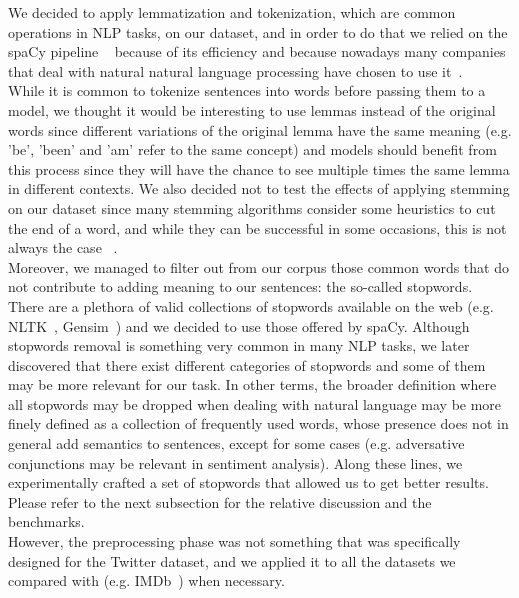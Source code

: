 We decided to apply lemmatization and tokenization, which are common operations in NLP tasks, on our dataset, and in order to do that we relied on the spaCy pipeline ~\cite{startups:spaCy} because of its efficiency and because nowadays many companies that deal with natural natural language processing have chosen to use it~\cite{data:companies_using_spacy}.\\

While it is common to tokenize sentences into words before passing them to a model, we thought it would be interesting to use lemmas instead of the original words since different variations of the original lemma have the same meaning (e.g. 'be', 'been' and 'am' refer to the same concept) and models should benefit from this process since they will have the chance to see multiple times the same lemma in different contexts. We also decided not to test the effects of applying stemming on our dataset since many stemming algorithms consider some heuristics to cut the end of a word, and while they can be successful in some occasions, this is not always the case ~\cite{data:standfordNLP}.\\

Moreover, we managed to filter out from our corpus those common words that do not contribute to adding meaning to our sentences: the so-called stopwords. There are a plethora of valid collections of stopwords available on the web (e.g. NLTK~\cite{startups:nltk}, Gensim~\cite{startups:gensim}) and we decided to use those offered by spaCy. Although stopwords removal is something very common in many NLP tasks, we later discovered that there exist different categories of stopwords and some of them may be more relevant for our task. In other terms, the broader definition where all stopwords may be dropped when dealing with natural language may be more finely defined as a collection of frequently used words, whose presence does not in general add semantics to sentences, except for some cases (e.g. adversative conjunctions may be relevant in sentiment analysis).
Along these lines, we experimentally crafted a set of stopwords that allowed us to get better results. Please refer to the next subsection for the relative discussion and the benchmarks.\\

However, the preprocessing phase was not something that was specifically designed for the Twitter dataset, and we applied it to all the datasets we compared with (e.g. IMDb~\cite{data:imdb}) when necessary.

